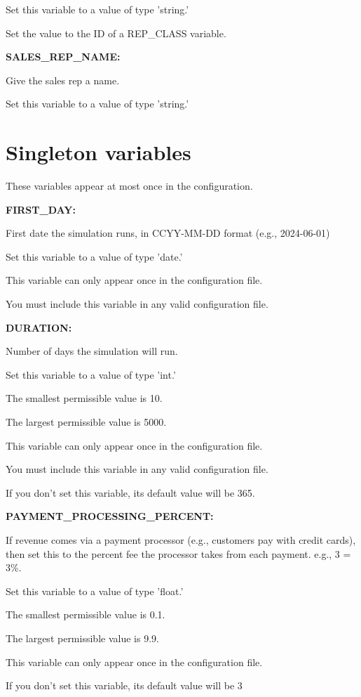 Set this variable to a value of type 'string.'

Set the value to the ID of a REP\_CLASS variable.


\textbf{SALES\_REP\_NAME:}


Give the sales rep a name.

Set this variable to a value of type 'string.'


\section{Singleton variables}


These variables appear at most once in the configuration.


\textbf{FIRST\_DAY:}


First date the simulation runs, in CCYY-MM-DD format (e.g., 2024-06-01)

Set this variable to a value of type 'date.'

This variable can only appear once in the configuration file.

You must include  this variable in any valid configuration file.


\textbf{DURATION:}


Number of days the simulation will run.

Set this variable to a value of type 'int.'

The smallest permissible value is 10.

The largest permissible value is 5000.

This variable can only appear once in the configuration file.

You must include  this variable in any valid configuration file.

If you don't set this variable, its default value will be 365.


\textbf{PAYMENT\_PROCESSING\_PERCENT:}


If revenue comes via a payment processor (e.g., customers pay with credit cards), then set this to the percent fee the processor takes from each payment.  e.g., 3 = 3\%.

Set this variable to a value of type 'float.'

The smallest permissible value is 0.1.

The largest permissible value is 9.9.

This variable can only appear once in the configuration file.

If you don't set this variable, its default value will be 3



